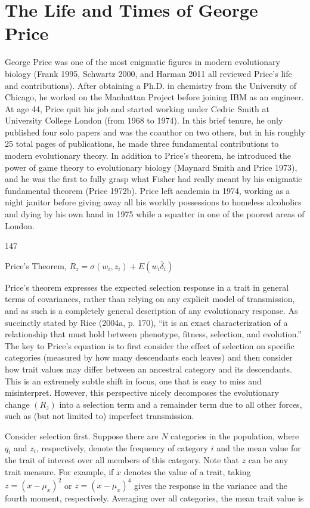 \documentclass{article}
\begin{document}
\section{The Life and Times of George Price}
George Price was one of the most enigmatic figures in modern evolutionary biology (Frank 1995, Schwartz 2000, and Harman 2011 all reviewed Price's life and contributions). After obtaining a Ph.D. in chemistry from the University of Chicago, he worked on the Manhattan Project before joining IBM as an engineer. At age 44, Price quit his job and started working under Cedric Smith at University College London (from 1968 to 1974). In this brief tenure, he only published four solo papers and was the coauthor on two others, but in his roughly 25 total pages of publications, he made three fundamental contributions to modern evolutionary theory. In addition to Price's theorem, he introduced the power of game theory to evolutionary biology (Maynard Smith and Price 1973), and he was the first to fully grasp what Fisher had really meant by his enigmatic fundamental theorem (Price 1972b). Price left academia in 1974, working as a night janitor before giving away all his worldly possessions to homeless alcoholics and dying by his own hand in 1975 while a squatter in one of the poorest areas of London.

147

Price's Theorem,  $ R_{z} = \sigma(w_{i}, z_{i}) + E(w_{i} \bar{\delta}_{i}) $

Price’s theorem expresses the expected selection response in a trait in general terms of covariances, rather than relying on any explicit model of transmission, and as such is a completely general description of any evolutionary response. As succinctly stated by Rice (2004a, p. 170), “it is an exact characterization of a relationship that must hold between phenotype, fitness, selection, and evolution.” The key to Price’s equation is to first consider the effect of selection on specific categories (measured by how many descendants each leaves) and then consider how trait values may differ between an ancestral category and its descendants. This is an extremely subtle shift in focus, one that is easy to miss and misinterpret. However, this perspective nicely decomposes the evolutionary change  $ (R_{z}) $ into a selection term and a remainder term due to all other forces, such as (but not limited to) imperfect transmission.

Consider selection first. Suppose there are $N$ categories in the population, where $q_i$ and $z_i$, respectively, denote the frequency of category $i$ and the mean value for the trait of interest over all members of this category. Note that $z$ can be any trait measure. For example, if $x$ denotes the value of a trait, taking $z = (x - \mu_x)^2$ or $z = (x - \mu_x)^4$ gives the response in the variance and the fourth moment, respectively. Averaging over all categories, the mean trait value is
\end{document}
